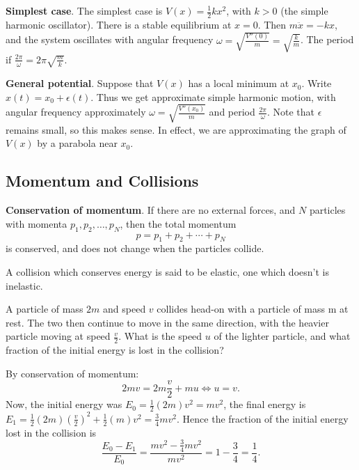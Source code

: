 \documentclass[10pt, a4paper]{article}
\begin{document}
\textbf{Simplest case}.
The simplest case is $V(x) = \frac{1}{2}kx ^ 2$,
with $k > 0$
(the simple harmonic oscillator).
There is a stable equilibrium at $x = 0$.
Then $m\ddot{x} = -kx$,
and the system oscillates with angular frequency $\omega = \sqrt{\frac{V''(0)}{m}} = \sqrt{\frac{k}{m}}$.
The period if $\frac{2\pi}{\omega} = 2\pi\sqrt{\frac{m}{k}}$.

\textbf{General potential}.
Suppose that $V(x)$ has a local minimum at $x_0$.
Write $x(t) = x_0 + \epsilon(t)$.
Thus we get approximate simple harmonic motion,
with angular frequency approximately $\omega = \sqrt{\frac{V''(x_0)}{m}}$ and period $\frac{2\pi}{\omega}$.
Note that $\epsilon$ remains small,
so this makes sense.
In effect,
we are approximating the graph of $V(x)$ by a parabola near $x_0$.

\subsection{Momentum and Collisions}
\textbf{Conservation of momentum}.
If there are no external forces,
and $N$ particles with momenta $p_1, p_2, \dotsc, p_N$,
then the total momentum
\[
p = p_1 + p_2 + \dotsi + p_{N}
\]
is conserved,
and does not change when the particles collide.

A collision which conserves energy is said to be elastic,
one which doesn't is inelastic.

\begin{example}
     A particle of mass $2m$ and speed $v$ collides head-on with a particle of mass m at rest.
     The two then continue to move in the same direction,
     with the heavier particle moving at speed $\frac{v}{2}$.
     What is the speed $u$ of the lighter particle,
     and what fraction of the initial energy is lost in the collision?

     \begin{solution}
         By conservation of momentum:
         \[
         2mv = 2m\frac{v}{2} + mu \iff u = v.
         \]
         Now,
         the initial energy was $E_0 = \frac{1}{2}(2m)v ^ 2 = mv ^ 2$,
         the final energy is $E_1 = \frac{1}{2}(2m)\left(\frac{v}{2}\right) ^ 2 + \frac{1}{2}(m)v ^ 2 = \frac{3}{4}mv ^ 2$.
         Hence the fraction of the initial energy lost in the collision is
         \[
         \frac{E_0 - E_1}{E_0} = \frac{mv ^ 2 - \frac{3}{4}mv ^ 2}{mv ^ 2} = 1 - \frac{3}{4} = \frac{1}{4}.
         \]
     \end{solution}
\end{example}
\end{document}
